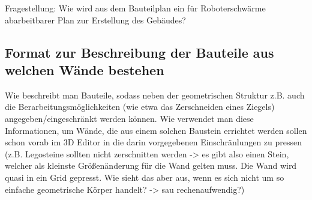 Fragestellung: Wie wird aus dem Bauteilplan ein für Roboterschwärme abarbeitbarer Plan zur Erstellung des Gebäudes?

\subsection{Format zur Beschreibung der Bauteile aus welchen Wände bestehen}
Wie beschreibt man Bauteile, sodass neben der geometrischen Struktur z.B. auch die Berarbeitungsmöglichkeiten (wie etwa das Zerschneiden eines Ziegels) angegeben/eingeschränkt werden können.
Wie verwendet man diese Informationen, um Wände, die aus einem solchen Baustein errichtet werden sollen schon vorab im 3D Editor in die darin vorgegebenen Einschränlungen zu pressen (z.B. Legosteine sollten nicht zerschnitten werden -> es gibt also einen Stein, welcher als kleinste Größenänderung für die Wand gelten muss. Die Wand wird quasi in ein Grid gepresst. Wie sieht das aber aus, wenn es sich nicht um so einfache geometrische Körper handelt? -> sau rechenaufwendig?)